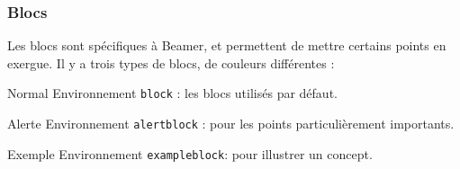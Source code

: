 \documentclass[10pt,    %
    french,             %
    xcolor=table,       %
    envcountsect        %
]{beamer}
\begin{document}
\begin{frame}
    \frametitle{Blocs}
    \label{frm:blocks}
    
    Les blocs sont spécifiques à Beamer, et permettent de mettre certains points en exergue. Il y a trois types de blocs, de couleurs différentes :

    \begin{block}{Normal}
        Environnement \texttt{block} : les blocs utilisés par défaut.
    \end{block}

    \begin{alertblock}{Alerte}
        Environnement \texttt{alertblock} : pour les points particulièrement importants.
    \end{alertblock}

    \begin{exampleblock}{Exemple}
        Environnement \texttt{exampleblock}: pour illustrer un concept.
    \end{exampleblock}
\end{frame}
\end{document}
